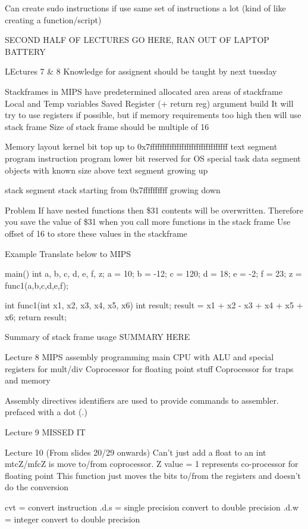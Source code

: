 \documentclass{article}
\begin{document}
		Can create sudo instructions if use same set of instructions a lot (kind of like creating a function/script)


	SECOND HALF OF LECTURES GO HERE, RAN OUT OF LAPTOP BATTERY

LEctures 7 \& 8
	Knowledge for assignent should be taught by next tuesday

	Stackframes
		in MIPS have predetermined allocated area
		areas of stackframe
			Local and Temp variables
			Saved Register (+ return reg)
			argument build
		It will try to use registers if possible, but if memory requirements too high then will use stack frame
		Size of stack frame should be multiple of 16

	Memory layout
		kernel bit
			top up to 0x7ffffffffffffffffffffffffffffffff
		text segment
			program instruction program
			lower bit reserved for OS special task
		data segment
			objects with known size
			above text segment growing up

		stack segment
			stack starting from 0x7ffffffffff growing down

		Problem 
			If have nested functions then \$31 contents will be overwritten. Therefore you save the value of \$31 when you call more functions in the stack frame
			Use offset of 16 to store these values in the stackframe

	Example
		Translate below to MIPS

		main(){
			int a, b, c, d, e, f, z;
			a = 10; b = -12; c = 120; d = 18; e = -2; f = 23;
			z = func1(a,b,c,d,e,f);
		}

		int func1(int x1, x2, x3, x4, x5, x6){
			int result;
			result = x1 + x2 - x3 + x4 + x5 + x6;
			return result;
		}

	Summary of stack frame usage
		SUMMARY HERE

Lecture 8
	MIPS assembly programming
		main CPU with ALU and special registers for mult/div
		Coprocessor for floating point stuff
		Coprocessor for traps and memory

		Assembly directives
			identifiers are used to provide commands to assembler.
			prefaced with a dot (.)

Lecture 9
	MISSED IT

Lecture 10 (From slides 20/29 onwards)
	Can't just add a float to an int
	mtcZ/mfcZ is move to/from coprocessor. Z value = 1 represents co-processor for floating point
		This function just moves the bits to/from the registers and doesn't do the conversion

	cvt = convert instruction
	.d.s = single precision convert to double precision
	.d.w = integer convert to double precision
\end{document}
